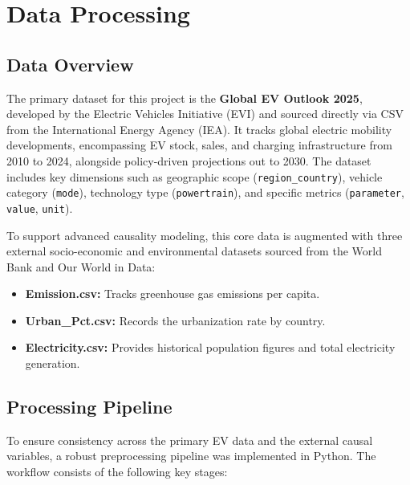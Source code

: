 \section{Data Processing}
\subsection{Data Overview}
The primary dataset for this project is the \textbf{Global EV Outlook 2025}, developed by the Electric Vehicles Initiative (EVI) and sourced directly via CSV from the International Energy Agency (IEA). It tracks global electric mobility developments, encompassing EV stock, sales, and charging infrastructure from 2010 to 2024, alongside policy-driven projections out to 2030. The dataset includes key dimensions such as geographic scope (\texttt{region\_country}), vehicle category (\texttt{mode}), technology type (\texttt{powertrain}), and specific metrics (\texttt{parameter}, \texttt{value}, \texttt{unit}).

To support advanced causality modeling, this core data is augmented with three external socio-economic and environmental datasets sourced from the World Bank and Our World in Data:
\begin{itemize}
    \item \textbf{Emission.csv:} Tracks greenhouse gas emissions per capita.
    \item \textbf{Urban\_Pct.csv:} Records the urbanization rate by country.
    \item \textbf{Electricity.csv:} Provides historical population figures and total electricity generation.
\end{itemize}


\subsection{Processing Pipeline}
To ensure consistency across the primary EV data and the external causal variables, a robust preprocessing pipeline was implemented in Python. The workflow consists of the following key stages:

